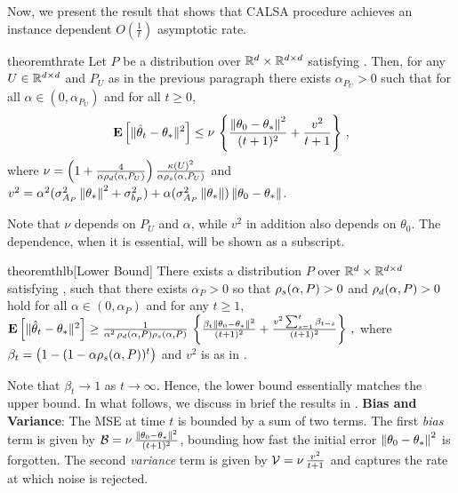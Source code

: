 Now, we present the result that shows that CALSA procedure achieves an instance dependent $O(\frac{1}{t})$ asymptotic rate.
\fi
\begin{restatable}{theorem}{thrate}\label{th:rate}
Let $P$ be a distribution over $\mathbb{R}^d\times \mathbb{R}^{d \times d}$ satisfying .
Then, for any $U\in\mathbb{R}^{d \times d}$ and $P_U$ as in the previous paragraph there exists
$\alpha_{P_U}>0$ such that 
for all $\alpha\in (0,\alpha_{P_U})$ and for all $t\ge 0$,
\begin{align*}
\mathbf{E}\left[\| \hat{\theta}_t-\theta_*\|^2\right]
\leq
\nu\,
\left\{\frac{\left\| \theta_0-\theta_*\right\|^2}{(t+1)^2}+ \frac{v^2}{t+1} \right\}\,,
\end{align*}
where $\nu = \left(1+\tfrac4{\alpha\rho_d(\alpha,P_U)}\right)\tfrac{\kappa(U)^2}{\alpha \rho_s(\alpha,P_U)}$ and
$v^2 = 
\alpha^2(\sigma_{A_P}^2\left\| \theta_*\right\|^2+\sigma_{b_P}^2)+\alpha (\sigma_{A_P}^2\left\| \theta_*\right\|)\left\| \theta_0-\theta_*\right\|$.
\end{restatable}
Note that $\nu$ depends on $P_U$ and $\alpha$, while $v^2$ in addition also depends on $\theta_0$. The dependence,  when it is essential, will be shown as a subscript.


\begin{restatable}{theorem}{thlb}[Lower Bound]\label{th:lb}
There exists a distribution $P$ over $\mathbb{R}^d\times \mathbb{R}^{d \times d}$ satisfying , such that
there exists $\alpha_P>0$ so that $\rho_s(\alpha,P)>0$ and $\rho_d(\alpha,P)>0$ hold for all $\alpha\in (0,\alpha_P)$ and
for any $t\ge 1$,  $\mathbf{E}\left[\| \hat{\theta}_t-\theta_*\|^2\right] 
\geq \frac{1}{\alpha^2 \, \rho_d(\alpha,P)\rho_s(\alpha,P)} \,\left\{ \frac{\beta_t \left\| \theta_0-\theta_*\right\|^2}{(t+1)^2} 
+ \frac{v^2\sum_{s=1}^t \beta_{t-s}  }{(t+1)^2} \right\}\,,$
where $\beta_{t} =  \big(1-(1-\alpha \rho_s(\alpha,P))^t\big)$ and $v^2$ is as in .
\end{restatable}
Note that $\beta_t \to 1$ as $t\to\infty$. Hence, the lower bound essentially matches the upper bound.
In what follows, we discuss in brief the results in . 
\textbf{Bias and Variance}: The MSE at time $t$ is bounded by a sum of two terms. The first \emph{bias} term is given by $\mathcal{B}=\nu \,\frac{\left\| \theta_0-\theta_*\right\|^2}{(t+1)^2}$, bounding how fast the initial error $\left\| \theta_0-\theta_*\right\|^2$ is forgotten. The second \emph{variance} term is given by $\mathcal{V}=\nu\, \frac{v^2}{t+1} $ and captures the rate at which noise is rejected. 


